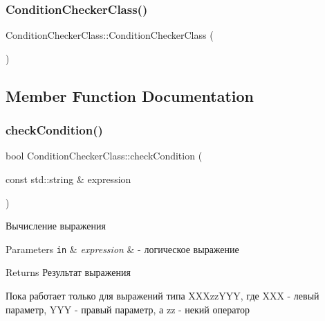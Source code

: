 \subsubsection{\texorpdfstring{Condition\+Checker\+Class()}{ConditionCheckerClass()}}
{\footnotesize\ttfamily Condition\+Checker\+Class\+::\+Condition\+Checker\+Class (\begin{DoxyParamCaption}{ }\end{DoxyParamCaption})}



\subsection{Member Function Documentation}
\mbox{\label{class_condition_checker_class_aaaf7a5ad55254c2669e4f38b447129b9}} 
\subsubsection{\texorpdfstring{check\+Condition()}{checkCondition()}}
{\footnotesize\ttfamily bool Condition\+Checker\+Class\+::check\+Condition (\begin{DoxyParamCaption}\item[{const std\+::string \&}]{expression }\end{DoxyParamCaption})}



Вычисление выражения 


\begin{DoxyParams}[1]{Parameters}
\mbox{\tt in}  & {\em expression} & -\/ логическое выражение \\
\hline
\end{DoxyParams}
\begin{DoxyReturn}{Returns}
Результат выражения
\end{DoxyReturn}
Пока работает только для выражений типа X\+X\+Xzz\+Y\+YY, где X\+XX -\/ левый параметр, Y\+YY -\/ правый параметр, а zz -\/ некий оператор \mbox{\label{class_condition_checker_class_a2b734cd5c6122ff67317fdc71e15e77b}} 
